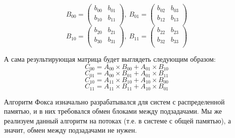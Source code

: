 \documentclass{article}
\begin{document}
\par
\[B_{00}= \left(
	\begin{matrix}
		b_{00}  &  b_{01}\\
		b_{10}  &  b_{11}\\
	\end{matrix}
\right),
~B_{01}= \left(
	\begin{matrix}
		b_{02}  &   b_{03}\\
		b_{12}  &   b_{13}\\
	\end{matrix}
\right)\]
\[B_{10}= \left(
	\begin{matrix}
		b_{20}  &  b_{21}\\
		b_{30}  &  b_{31}\\
	\end{matrix}
\right),
~B_{11}= \left(
	\begin{matrix}
		b_{22}  &  b_{23}\\
		b_{32}  &  b_{33}\\
	\end{matrix}
\right)\] 

\par
А сама результирующая матрица будет выглядеть следующим образом:
\[C_{00} = A_{00} \times B_{00} + A_{01} \times B_{10}\]
\[C_{01} = A_{00} \times B_{01} + A_{01} \times B_{11}\]
\[C_{10} = A_{11} \times B_{10} + A_{10} \times B_{00}\]
\[C_{11} = A_{11} \times B_{11} + A_{10} \times B_{01}\]

\par
Алгоритм Фокса изначально разрабатывался для систем с распределенной памятью, и в них требовался обмен блоками между подзадачами.
Мы же реализуем данный алгоритм на потоках (т.е. в системе с общей памятью), а значит, обмен между подзадачами не нужен.
\newpage

\end{document}
